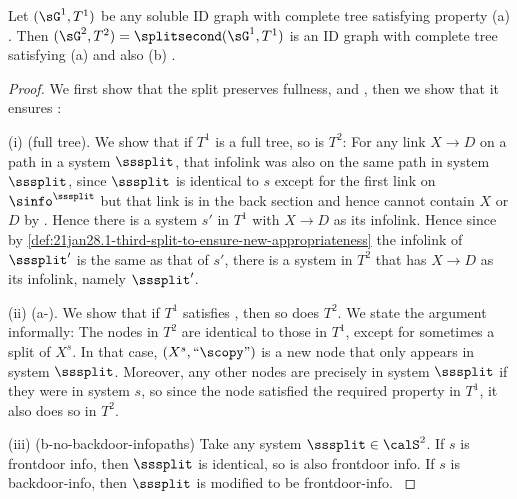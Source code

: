 \begin{lemma}
\label{le:21jan28.4-third-split-ensures-new-appropriateness}
Let $(\sG^1,T^1)$ be any soluble ID graph with complete tree satisfying property (a) \systemsAndPathsUniqueness. Then $(\sG^2,T^2)=\splitsecond(\sG^1,T^1)$ is an ID graph with complete tree satisfying (a) and also (b) \newAppropriateness.
\end{lemma}

\begin{proof} 
We first show that the split preserves fullness, \systemsAndPathsUniqueness and \noOverlappingQX, then we show that it ensures \newAppropriateness:

    {(i)} {(full tree)}. We show that if ${T^1}$ is a full tree, so is $T^2$: For any link $X\to D$ on a path in a system $\sssplit$, that infolink was also on the same path in system $\sssplit$, since $\sssplit$ is identical to $s$ except for the first link on $\sinfo^{\sssplit}$ but that link is in the back section and hence cannot contain $X$ or $D$ by . Hence there is a system $s'$ in ${T^1}$ with $X\to D$ as its infolink. Hence since by \autoref{def:21jan28.1-third-split-to-ensure-new-appropriateness} the infolink of $\sssplit'$ is the same as that of $s'$, there is a system in $T^2$ that has $X\to D$ as its infolink, namely $\sssplit'$.~
    
    {(ii)} {(a-\systemsAndPathsUniqueness)}.
    We show that if ${T^1}$ satisfies \systemsAndPathsUniqueness, then so does $T^2$. We state the argument informally: The nodes in $T^2$ are identical to those in ${T^1}$, except for sometimes a split of $X^s$. In that case, $(X^s, ``\scopy")$ is a new node that only appears in system $\sssplit$. Moreover, any other nodes are precisely in system $\sssplit$ if they were in system $s$, so since the node satisfied the required property in ${T^1}$, it also does so in $T^2$.
    
    
    
    {
    (iii) {(b-no-backdoor-infopaths)} Take any system $\sssplit\in \calS^2$. 
    If $s$ is frontdoor info, then $\sssplit$ is identical, so is also frontdoor info.
    If $s$ is backdoor-info, then $\sssplit$ is modified to be frontdoor-info.
    }
\end{proof} 






